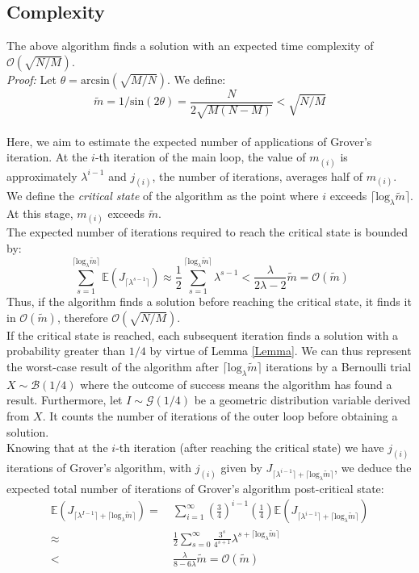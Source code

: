 \subsection{Complexity}
The above algorithm finds a solution with an expected time complexity of $\mathcal{O}(\sqrt{N/M})$.
\\[5pt]
\textit{Proof:} Let $\theta = \mathrm{arcsin}(\sqrt{M/N})$. We define: \[\tilde{m} = 1/\mathrm{sin}(2\theta) = \frac{N}{2\sqrt{M(N-M)}} < \sqrt{N/M}\]
\\[5pt]
Here, we aim to estimate the expected number of applications of Grover's iteration. At the $i$-th iteration of the main loop, the value of $m_{(i)}$ is approximately $\lambda^{i-1}$ and $j_{(i)}$, the number of iterations, averages half of $m_{(i)}$.
We define the \textit{critical state} of the algorithm as the point where $i$ exceeds $\lceil \mathrm{log}_{\lambda}\tilde{m} \rceil$. At this stage, $m_{(i)}$ exceeds $\tilde{m}$.
\\[5pt]
The expected number of iterations required to reach the critical state is bounded by:
\[\sum_{s=1}^{\lceil \mathrm{log}_{\lambda}\tilde{m} \rceil} \mathbb{E}(J_{\lceil \lambda^{s-1}\rceil}) \approx \frac{1}{2} \sum_{s=1}^{\lceil \mathrm{log}_{\lambda}\tilde{m} \rceil} \lambda^{s-1} < \frac{\lambda}{2\lambda-2}\tilde{m} = \mathcal{O}(\tilde{m})\]
Thus, if the algorithm finds a solution before reaching the critical state, it finds it in $\mathcal{O}(\tilde{m})$, therefore $\mathcal{O}(\sqrt{N/M})$.
\\[5pt]
If the critical state is reached, each subsequent iteration finds a solution with a probability greater than $1/4$ by virtue of Lemma \ref{Lemma}.
We can thus represent the worst-case result of the algorithm after $\lceil \mathrm{log}_{\lambda}\tilde{m} \rceil$ iterations by a Bernoulli trial $X \sim \mathcal{B}(1/4)$ where the outcome of success means the algorithm has found a result.
Furthermore, let $I \sim \mathcal{G}(1/4)$ be a geometric distribution variable derived from $X$. It counts the number of iterations of the outer loop before obtaining a solution.
\\[5pt]
Knowing that at the $i$-th iteration (after reaching the critical state) we have $j_{(i)}$ iterations of Grover's algorithm, with $j_{(i)}$ given by $J_{\lceil \lambda^{i-1}\rceil + \lceil \mathrm{log}_{\lambda}\tilde{m} \rceil}$, we deduce the expected total number of iterations of Grover's algorithm post-critical state:
\begin{align*}
\mathbb{E}(J_{\lceil \lambda^{I-1}\rceil + \lceil \mathrm{log}_{\lambda}\tilde{m} \rceil})
=&\ \sum_{i=1}^{\infty} \left( \frac{3}{4} \right) ^{i-1} \! \left( \frac{1}{4} \right) \mathbb{E}(J_{\lceil \lambda^{i-1}\rceil + \lceil \mathrm{log}_{\lambda}\tilde{m} \rceil}) \\
\approx&\ \frac{1}{2} \sum_{s=0}^{\infty} \frac{3^s}{4^{s+1}}\lambda^{s+\lceil \mathrm{log}_{\lambda}\tilde{m} \rceil} \\
<&\ \frac{\lambda}{8-6\lambda}\tilde{m} = \mathcal{O}(\tilde{m})
\end{align*}
